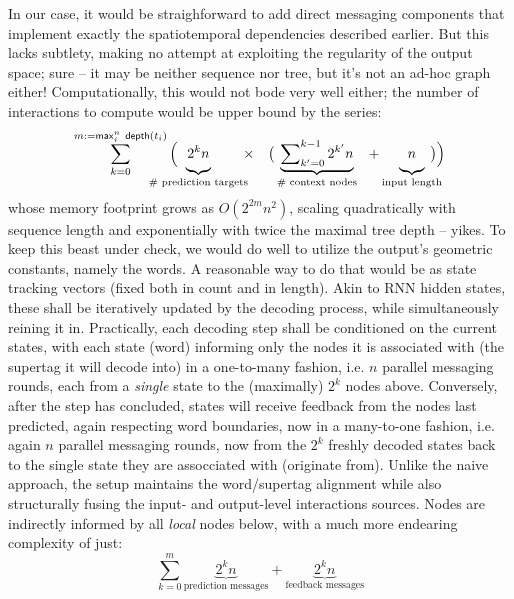 In our case, it would be straighforward to add direct messaging components that implement exactly the spatiotemporal dependencies described earlier.
But this lacks subtlety, making no attempt at exploiting the regularity of the output space; sure -- it may be neither sequence nor tree, but it's not an ad-hoc graph either!
Computationally, this would not bode very well either; the number of interactions to compute would be upper bound by the series:
\begin{equation}\label{equation:dense_graph}
\sum_{k=0}^{m := \mathsf{max}_i^n ~ \mathsf{depth}(t_i)}
	\Big(
	\hspace{-22.5pt}
	\underbrace{\vphantom{\sum\nolimits_{k'}^{k}} 2^{k}n}_{\text{\# prediction targets}}
	\hspace{-5pt}
	\times
	~~~
	\big(
	\underbrace{\sum\nolimits_{k'=0}^{k-1} 2^{k'}n}_{\text{\# context nodes}}
	~~
	+ 
	\underbrace{\vphantom{\sum\nolimits_{k'}^{k}}  n}_{\text{input length}}
	\hspace{-10pt}
	\big)
	\Big)
\end{equation}
whose memory footprint grows as $O(2^{2m} n^2)$, scaling quadratically with sequence length and exponentially with twice the maximal tree depth -- yikes.
To keep this beast under check, we would do well to utilize the output's geometric constants, namely the words.
A reasonable way to do that would be as state tracking vectors (fixed both in count and in length).
Akin to RNN hidden states, these shall be iteratively updated by the decoding process, while simultaneously reining it in.
Practically, each decoding step shall be conditioned on the current states, with each state (word) informing only the nodes it is associated with (the supertag it will decode into) in a one-to-many fashion, i.e. $n$ parallel messaging rounds, each from a \textit{single} state to the (maximally) $2^k$ nodes above.
Conversely, after the step has concluded, states will receive feedback from the nodes last predicted, again respecting word boundaries, now in a many-to-one fashion, i.e. again $n$ parallel messaging rounds, now from the $2^k$ freshly decoded states back to the single state they are assocciated with (originate from).
Unlike the naive approach, the setup maintains the word/supertag alignment while also structurally fusing the input- and output-level interactions sources.
Nodes are indirectly informed by all \textit{local} nodes below, with a much more endearing complexity of just:
\begin{equation}
\sum_{k=0}^{m}
	\underbrace{2^{k} n}_{\text{prediction messages}}
	+
	\underbrace{2^{k} n}_{\text{feedback messages}}
\end{equation}
